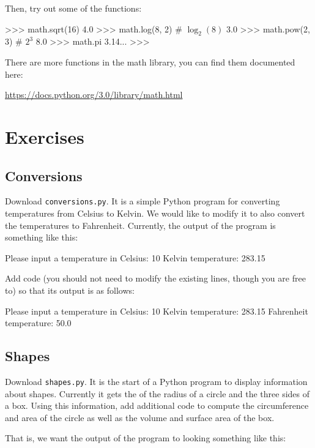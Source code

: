 \documentclass[11pt]{cselabheader}
\begin{document}
Then, try out some of the functions:

\begin{python3code}
>>> math.sqrt(16)
4.0
>>> math.log(8, 2) # $\log_2(8)$
3.0
>>> math.pow(2, 3) # $2^3$
8.0
>>> math.pi
3.14...
>>>
\end{python3code}

There are more functions in the math library, you can find them documented here:
\begin{center}
\url{https://docs.python.org/3.0/library/math.html}
\end{center}

\pagebreak

\section{Exercises}
\subsection{Conversions}
Download \texttt{conversions.py}. It is a simple Python program for converting
temperatures from Celsius to Kelvin. We would like to modify it to also convert
the temperatures to Fahrenheit. Currently, the output of the program is
something like this:

\begin{bashcode}
Please input a temperature in Celsius: 10
Kelvin temperature: 283.15
\end{bashcode}

Add code (you should not need to modify the existing lines, though you are free
to) so that its output is as follows:

\begin{bashcode}
Please input a temperature in Celsius: 10
Kelvin temperature: 283.15
Fahrenheit temperature: 50.0
\end{bashcode}

\subsection{Shapes}
Download \texttt{shapes.py}. It is the start of a Python program to display
information about shapes. Currently it gets the of the radius of a circle and
the three sides of a box. Using this information, add additional code to compute
the circumference and area of the circle as well as the volume and surface area
of the box.

That is, we want the output of the program to looking something like this:
\end{document}
